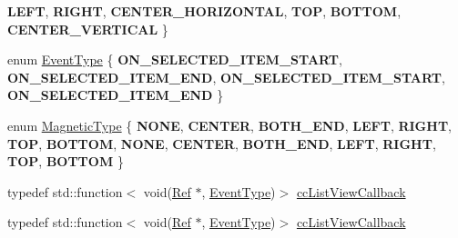 \begin{DoxyCompactItemize}
{\bfseries L\+E\+FT}, 
{\bfseries R\+I\+G\+HT}, 
\newline
{\bfseries C\+E\+N\+T\+E\+R\+\_\+\+H\+O\+R\+I\+Z\+O\+N\+T\+AL}, 
{\bfseries T\+OP}, 
{\bfseries B\+O\+T\+T\+OM}, 
{\bfseries C\+E\+N\+T\+E\+R\+\_\+\+V\+E\+R\+T\+I\+C\+AL}
 \}
\item 
enum \hyperlink{classui_1_1ListView_a7ef851492220e4bccadbaf16d95d26b9}{Event\+Type} \{ {\bfseries O\+N\+\_\+\+S\+E\+L\+E\+C\+T\+E\+D\+\_\+\+I\+T\+E\+M\+\_\+\+S\+T\+A\+RT}, 
{\bfseries O\+N\+\_\+\+S\+E\+L\+E\+C\+T\+E\+D\+\_\+\+I\+T\+E\+M\+\_\+\+E\+ND}, 
{\bfseries O\+N\+\_\+\+S\+E\+L\+E\+C\+T\+E\+D\+\_\+\+I\+T\+E\+M\+\_\+\+S\+T\+A\+RT}, 
{\bfseries O\+N\+\_\+\+S\+E\+L\+E\+C\+T\+E\+D\+\_\+\+I\+T\+E\+M\+\_\+\+E\+ND}
 \}
\item 
enum \hyperlink{classui_1_1ListView_a143593e762b785241572552b060aed6f}{Magnetic\+Type} \{ \newline
{\bfseries N\+O\+NE}, 
{\bfseries C\+E\+N\+T\+ER}, 
{\bfseries B\+O\+T\+H\+\_\+\+E\+ND}, 
{\bfseries L\+E\+FT}, 
\newline
{\bfseries R\+I\+G\+HT}, 
{\bfseries T\+OP}, 
{\bfseries B\+O\+T\+T\+OM}, 
{\bfseries N\+O\+NE}, 
\newline
{\bfseries C\+E\+N\+T\+ER}, 
{\bfseries B\+O\+T\+H\+\_\+\+E\+ND}, 
{\bfseries L\+E\+FT}, 
{\bfseries R\+I\+G\+HT}, 
\newline
{\bfseries T\+OP}, 
{\bfseries B\+O\+T\+T\+OM}
 \}
\item 
typedef std\+::function$<$ void(\hyperlink{classRef}{Ref} $\ast$, \hyperlink{classui_1_1ListView_a7ef851492220e4bccadbaf16d95d26b9}{Event\+Type})$>$ \hyperlink{classui_1_1ListView_ac67b2dd17d792bb61a9020b3935ffc79}{cc\+List\+View\+Callback}
\item 
typedef std\+::function$<$ void(\hyperlink{classRef}{Ref} $\ast$, \hyperlink{classui_1_1ListView_a7ef851492220e4bccadbaf16d95d26b9}{Event\+Type})$>$ \hyperlink{classui_1_1ListView_ac67b2dd17d792bb61a9020b3935ffc79}{cc\+List\+View\+Callback}
\end{DoxyCompactItemize}
